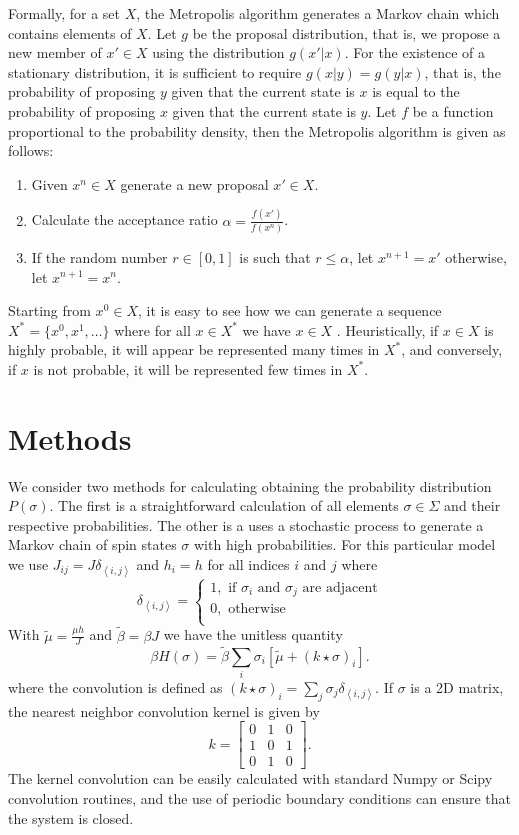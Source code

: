 \documentclass{llncs}
\newcommand{\tmu}{\ensuremath{\tilde \mu}}
\newcommand{\tbeta}{\ensuremath{\tilde \beta}}
\newcommand{\dij}{ \ensuremath{\delta_{\left<i,j\right>} }}
\begin{document}
Formally, for a set $X$, the Metropolis algorithm generates a Markov chain which contains elements of $X$. Let $g$ be the proposal distribution, that is, we propose a new member of $x'\in X$ using the distribution $g(x'|x)$. For the existence of a stationary distribution, it is sufficient to require $g(x|y)=g(y|x)$\cite{robert}, that is, the probability of proposing $y$ given that the current state is $x$ is equal to the probability of proposing $x$ given that the current state is $y$. Let $f$ be a function proportional to the probability density, then the Metropolis algorithm is given as follows:
\begin{enumerate}
	\item Given $x^{n}\in X$ generate a new proposal $x'\in X$. 
	\item Calculate the acceptance ratio $\alpha =\frac{f(x')}{f(x^{n})}$. 
	\item If the random number $r\in[0,1]$ is such that $r\leq \alpha$, let $x^{n+1}=x'$ otherwise, let $x^{n+1}=x^{n}$. 
\end{enumerate}
Starting from $x^0\in X$, it is easy to see how we can generate a sequence $X^*=\{x^0,x^1,\dots\}$ where for all $ x \in X^*$ we have $x\in X$ \cite{}. Heuristically, if $x\in X$ is highly probable, it will appear be represented many times in $X^*$, and conversely, if $x$ is not probable, it will be represented few times in $X^*$.

\section{Methods}
We consider two methods for calculating obtaining the probability distribution $P(\sigma)$. The first is a straightforward calculation of all elements $\sigma\in\Sigma$ and their respective probabilities. The other is a uses a stochastic process to generate a Markov chain of spin states $\sigma$ with high probabilities.  
For this particular model we use $J_{ij}=J\dij$ and $h_{i}=h$ for all indices $i$ and $j$ where 
$$\dij=\begin{cases}
1, \text{ if $\sigma_i$ and $\sigma_j$ are adjacent}	\\
0, \text{ otherwise}	\\
\end{cases}$$
With $\tmu=\frac{\mu h}{J}$ and $\tbeta = \beta J$ we have the unitless quantity
\begin{equation} 
\beta H(\sigma)=\tbeta\sum_i\sigma_i\left[\tmu+(k\star\sigma)_i\right].
\end{equation}
where the convolution is defined as $(k\star\sigma)_i=\sum_j\sigma_j\dij$. If $\sigma$ is a 2D matrix, the nearest neighbor convolution kernel is given by $$k=\begin{bmatrix}
0 & 1 & 0\\
1 & 0 & 1 \\
0 & 1 & 0 
\end{bmatrix}.$$
The kernel convolution can be easily calculated with standard Numpy or Scipy convolution routines, and the use of periodic boundary conditions can ensure that the system is closed. 
\end{document}
